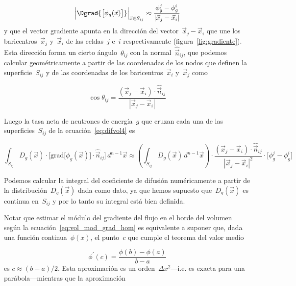 \begin{equation}\label{eq:vol_mod_grad_hom}
\Big| \Dgrad {\big[ \phi_g(\vec{x}) \big]} \Big|_{\vec{x} \in S_{ij}} \approx \frac{\phi_g^j - \phi_g^i}{ | \vec{x}_j - \vec{x}_i |}
\end{equation}
%
y que el vector gradiente apunta en la dirección del vector~$\vec{x}_j-\vec{x}_i$ que une los baricentros~$\vec{x}_j$ y~$\vec{x}_i$ de las celdas~$j$ e~$i$ respectivamente (figura~\ref{fig:gradiente}). Esta dirección  forma un cierto ángulo~$\theta_{ij}$ con la normal~$\hat{\vec{n}}_{ij}$, que podemos calcular geométricamente a partir de las coordenadas de los nodos que definen la superficie~$S_{ij}$ y de las coordenadas de los baricentros~$\vec{x}_i$ y~$\vec{x}_j$ como

\begin{equation*}
 \cos \theta_{ij} = \frac{(\vec{x}_j - \vec{x}_i) \cdot \hat{\vec{n}}_{ij}}{| \vec{x}_j - \vec{x}_i |}
\end{equation*}


Luego la tasa neta de neutrones de energía~$g$ que cruzan cada una de las superficies~$S_{ij}$ de la ecuación~\eqref{eq:difvol4} es

\begin{equation}\label{eq:vol-tasa-cruce-hom}
\int_{S_{ij}} D_g(\vec{x}) \cdot \Big[ \text{grad} {\big[\phi_g(\vec{x})\big]}  \cdot \hat{\vec{n}}_{ij} \Big] \, d^{n-1} \vec{x}
\approx
\left( \int_{S_{ij}} D_g(\vec{x}) \, d^{n-1} \vec{x} \right) \cdot \frac{(\vec{x}_j - \vec{x}_i) \cdot \hat{\vec{n}}_{ij}}{| \vec{x}_j - \vec{x}_i |^2}  \cdot \Big[ \phi_g^j - \phi_g^i\Big]
\end{equation}


Podemos calcular la integral del coeficiente de difusión numéricamente a partir de la distribución~$D_g(\vec{x})$ dada como dato, ya que hemos supuesto que~$D_g(\vec{x})$ es continua en~$S_{ij}$ y por lo tanto su integral está bien definida.

\medskip

Notar que estimar el módulo del gradiente del flujo en el borde del volumen según la ecuación~\eqref{eq:vol_mod_grad_hom} es equivalente a suponer que, dada una función continua~$\phi(x)$, el punto~$c$ que cumple el teorema del valor medio

\begin{equation*}
 \phi^{\prime}(c) = \frac{\phi(b) - \phi(a)}{b - a}
\end{equation*}
%
es $c \approx (b-a)/2$. Esta aproximación es un orden~$\Delta x^2$---i.e. es exacta para una parábola---mientras que la aproximación

